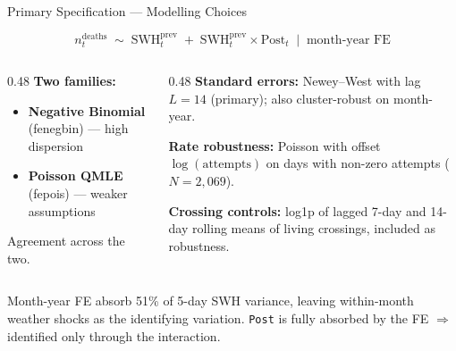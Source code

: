 \documentclass[aspectratio=169,10pt]{beamer}
\begin{document}
\begin{frame}{Primary Specification --- Modelling Choices}

\[
n^{\text{deaths}}_{t} \;\sim\; \text{SWH}^{\text{prev}}_{t}
\;+\; \text{SWH}^{\text{prev}}_{t}\!\times\!\text{Post}_t
\;\mid\; \text{month-year FE}
\]

\vspace{0.3em}
\begin{columns}[T]
\begin{column}{0.48\textwidth}
\textbf{Two families:}
\begin{itemize}
  \item \textbf{Negative Binomial} (fenegbin) --- high dispersion
  \item \textbf{Poisson QMLE} (fepois) --- weaker
    assumptions 
\end{itemize}
Agreement across the two.
\end{column}
\begin{column}{0.48\textwidth}
\textbf{Standard errors:} Newey--West with lag $L=14$ (primary); also
cluster-robust on month-year.

\vspace{0.4em}
\textbf{Rate robustness:} Poisson with offset $\log(\text{attempts})$ on
days with non-zero attempts ($N=2{,}069$).

\vspace{0.4em}
\textbf{Crossing controls:} log1p of lagged 7-day and 14-day rolling means
of living crossings, included as robustness.
\end{column}
\end{columns}

\vspace{0.5em}
\footnotesize
Month-year FE absorb 51\% of 5-day SWH variance, leaving within-month weather
shocks as the identifying variation. \texttt{Post} is fully absorbed by the FE
$\Rightarrow$ identified only through the interaction.
\end{frame}
\end{document}
